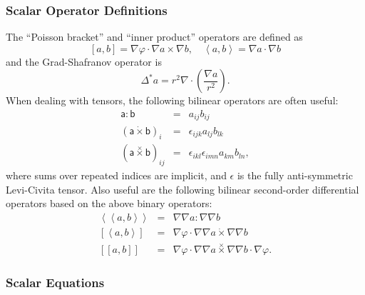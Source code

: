 \documentclass[letterpaper]{book}
\newcommand{\tensor}[1]{\mathsf{#1}}
\newcommand{\tor}{\varphi}              %
\newcommand{\grad}[1]{\nabla #1}
\renewcommand{\div}[1]{\nabla \cdot #1}
\newcommand{\dotdot}{:}
\newcommand{\dottimes}{\dot\times}
\newcommand{\timestimes}{\stackrel{\times}{\times}}
\newcommand{\gs}[1]{\Delta^* #1}
\newcommand{\pb}[2]{\left[#1,#2\right]}
\newcommand{\ip}[2]{\left\langle  #1,#2\right\rangle}
\newcommand{\funcss}[2]{
  \left\langle\left\langle #1,#2 \right\rangle\right\rangle}
\newcommand{\funcsa}[2]{\left[\left\langle #1,#2 \right\rangle\right]}
\newcommand{\funcaa}[2]{\left[\left[ #1,#2 \right]\right]}
\begin{document}
\subsubsection{Scalar Operator Definitions}

The ``Poisson bracket'' and ``inner product'' operators
are defined as
\[ 
\pb{a}{b} = \nabla \tor \cdot \grad{a} \times \grad{b}, 
\quad
\ip{a}{b} = \grad{a} \cdot \grad{b}
\]
and the Grad-Shafranov operator is
\[
\gs{a} = r^2 \div{\left(\frac{\grad{a}}{r^2}\right)}.
\]
When dealing with tensors, the following bilinear operators are often
useful:
\begin{eqnarray*}
  \tensor{a} \dotdot \tensor{b} & = & a_{i j} b_{i j}
  \\
  (\tensor{a} \dottimes \tensor{b})_i & = & \epsilon_{i j k}
  a_{l j} b_{l k}
  \\
  (\tensor{a} \timestimes \tensor{b})_{i j} & = & 
  \epsilon_{i k l} \epsilon_{i m n} a_{k m} b_{l n},
\end{eqnarray*}
where sums over repeated indices are implicit, and $\tensor{\epsilon}$
is the fully anti-symmetric Levi-Civita tensor.  Also useful are the
following bilinear second-order differential operators based on the
above binary operators:
\begin{eqnarray*}
  \funcss{a}{b} & = & \grad{\grad{a}} \dotdot \grad{\grad{b}} \\
  \funcsa{a}{b} & = & \grad{\tor} \cdot 
  \grad{\grad{a}} \dottimes \grad{\grad{b}}\\
  \funcaa{a}{b} & = & \grad{\tor} \cdot 
       \grad{\grad{a}} \timestimes \grad{\grad{b}}
       \cdot \grad{\tor}.
\end{eqnarray*}

\subsubsection{Scalar Equations}
\end{document}
